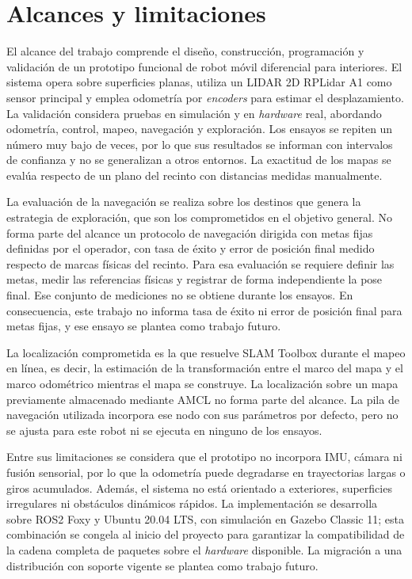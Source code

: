 \section*{Alcances y limitaciones}
{}
\label{sec:alcances}

El alcance del trabajo comprende el diseño, construcción, programación y validación de un prototipo funcional de robot móvil diferencial para interiores. El sistema opera sobre superficies planas, utiliza un \gls{LIDAR} 2D RPLidar A1 como sensor principal y emplea odometría por \textit{encoders} para estimar el desplazamiento. La validación considera pruebas en simulación y en \textit{hardware} real, abordando odometría, control, mapeo, navegación y exploración. Los ensayos se repiten un número muy bajo de veces, por lo que sus resultados se informan con intervalos de confianza y no se generalizan a otros entornos. La exactitud de los mapas se evalúa respecto de un plano del recinto con distancias medidas manualmente.

La evaluación de la navegación se realiza sobre los destinos que genera la
estrategia de exploración, que son los comprometidos en el objetivo general.
No forma parte del alcance un protocolo de navegación dirigida con metas fijas
definidas por el operador, con tasa de éxito y error de posición final medido
respecto de marcas físicas del recinto. Para esa evaluación se requiere definir
las metas, medir las referencias físicas y registrar de forma independiente la
pose final. Ese conjunto de mediciones no se obtiene durante los ensayos.
En consecuencia, este trabajo no informa tasa de éxito ni error de posición
final para metas fijas, y ese ensayo se plantea como trabajo futuro.

La localización comprometida es la que resuelve SLAM Toolbox durante el mapeo
en línea, es decir, la estimación de la transformación entre el marco del mapa
y el marco odométrico mientras el mapa se construye. La localización sobre un
mapa previamente almacenado mediante AMCL no forma parte del alcance. La pila
de navegación utilizada incorpora ese nodo con sus parámetros por defecto,
pero no se ajusta para este robot ni se ejecuta en ninguno de los ensayos.

Entre sus limitaciones se considera que el prototipo no incorpora \gls{IMU}, cámara ni fusión sensorial, por lo que la odometría puede degradarse en trayectorias largas o giros acumulados. Además, el sistema no está orientado a exteriores, superficies irregulares ni obstáculos dinámicos rápidos. La implementación se desarrolla sobre \gls{ROS2} Foxy y Ubuntu 20.04 LTS, con simulación en Gazebo Classic 11; esta combinación se congela al inicio del proyecto para garantizar la compatibilidad de la cadena completa de paquetes sobre el \textit{hardware} disponible. La migración a una distribución con soporte vigente se plantea como trabajo futuro.

